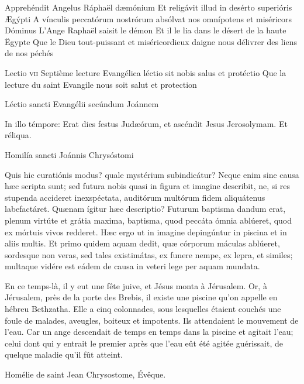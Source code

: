 \documentclass[twoside]{article}
\begin{document}
\begin{paracol}[1]{2}
\versiculusabsolutio
	{Apprehéndit Angelus Ráphaël dæmónium}
	{Et religávit illud in desérto superióris Ægýpti}
	{A vínculis peccatórum nostrórum absólvat nos omnípotens et miséricors Dóminus}
	{L’Ange Raphaël saisit le démon}
	{Et il le lia dans le désert de la haute Ëgypte}
	{Que le Dieu tout-puissant et miséricordieux daigne nous délivrer des liens de nos péchés}

\lectioresponsorium
	{Lectio \textsc{vii}}
	{Septième lecture}
	{Evangélica léctio sit nobis salus et protéctio}
	{Que la lecture du saint Evangile nous soit salut et protection}
	{
		Léctio sancti Evangélii secúndum Joánnem
		
		In illo témpore: Erat dies festus Judæórum, et ascéndit Jesus Jerosolymam. Et réliqua.
		
		Homilía sancti Joánnis Chrysóstomi

		Quis hic curatiónis modus? quale mystérium subindicátur? Neque enim sine causa hæc scripta sunt; sed futura nobis quasi in figura et imagine describit, ne, si res stupenda accideret inexspéctata, auditórum multórum fidem aliquátenus labefactáret. Quænam ígitur hæc descriptio? Futurum baptisma dandum erat, plenum virtúte et grátia maxima, baptisma, quod peccáta ómnia ablúeret, quod ex mórtuis vivos redderet. Hæc ergo ut in imagine depingúntur in piscina et in aliis multis. Et primo quidem aquam dedit, quæ córporum máculas ablúeret, sordesque non veras, sed tales existimátas, ex funere nempe, ex lepra, et similes; multaque vidére est eádem de causa in veteri lege per aquam mundata.
	}
	{
		
		En ce temps-là, il y eut une fête juive, et Jésus monta à Jérusalem.
		Or, à Jérusalem, près de la porte des Brebis, il existe une piscine qu’on appelle en hébreu Bethzatha. Elle a cinq colonnades,
		sous lesquelles étaient couchés une foule de malades, aveugles, boiteux et impotents.
		Ils attendaient le mouvement de l'eau.
		Car un ange descendait de temps en temps dans la piscine et agitait l'eau;
		celui dont qui y entrait le premier après que l'eau eût été agitée guérissait,
		de quelque maladie qu'il fût atteint.
		
		Homélie de saint Jean Chrysostome, Évêque.
		
		
}
\end{paracol}
\end{document}
